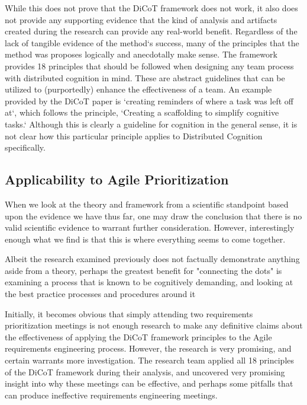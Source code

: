 While this does not prove that the DiCoT framework does not work, it also does not provide any supporting evidence that the kind of analysis and artifacts created during the research can provide any real-world benefit. Regardless of the lack of tangible evidence of the method`s success, many of the principles that the method was proposes logically and anecdotally make sense. The framework provides 18 principles that should be followed when designing any team process with distributed cognition in mind. These are abstract guidelines that can be utilized to (purportedly) enhance the effectiveness of a team. An example provided by the DiCoT paper is `creating reminders of where a task was left off at`, which follows the principle, `Creating a scaffolding to simplify cognitive tasks.` Although this is clearly a guideline for cognition in the general sense, it is not clear how this particular principle applies to Distributed Cognition specifically.

\subsection{Applicability to Agile Prioritization}
When we look at the theory and framework from a scientific standpoint based upon the evidence we have thus far, one may draw the conclusion that there is no valid scientific evidence to warrant further consideration. However, interestingly enough what we find is that this is where everything seems to come together.

Albeit the research examined previously does not factually demonstrate anything aside from a theory, perhaps the greatest benefit for "connecting the dots" is examining a process that is known to be cognitively demanding, and looking at the best practice processes and procedures around it

Initially, it becomes obvious that simply attending two requirements prioritization meetings is not enough research to make any definitive claims about the effectiveness of applying the DiCoT framework principles to the Agile requirements engineering process. However, the research is very promising, and certain warrants more investigation. The research team applied all 18 principles of the DiCoT framework during their analysis, and uncovered very promising insight into why these meetings can be effective, and perhaps some pitfalls that can produce ineffective requirements engineering meetings.

